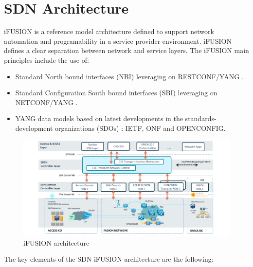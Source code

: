 \documentclass[a4paper,fleqn]{cas-dc}
\begin{document}
\section{SDN Architecture}
\label{section:arq}

i\uppercase{FUSION} is a reference model architecture defined to support network automation and programability in a service provider environment. i\uppercase{FUSION} defines a clear separation between network and service layers.  The i\uppercase{FUSION} main principles include the use of:
\begin{itemize}
    \item Standard North bound interfaces (NBI) leveraging on \uppercase{RESTconf/YANG} \cite{bierman2017restconf}.
    \item Standard Configuration South bound interfaces (SBI) leveraging on \uppercase{NETCONF/YANG} \cite{enns2011network}.
    \item YANG data models based on latest developments in the standards-development organizations (SDOs) \cite{bjorklund2016yang}: \uppercase{IETF}, \uppercase{ONF} and \uppercase{OpenConfig}.
\end{itemize}

\begin{figure}
	\centering
		\includegraphics[width=\linewidth]{figs/ifusion_architecture.png}
	\caption{i\uppercase{FUSION} architecture}
	\label{FIG:1}
\end{figure}

The key elements of the SDN i\uppercase{FUSION} architecture are the following:
\end{document}
